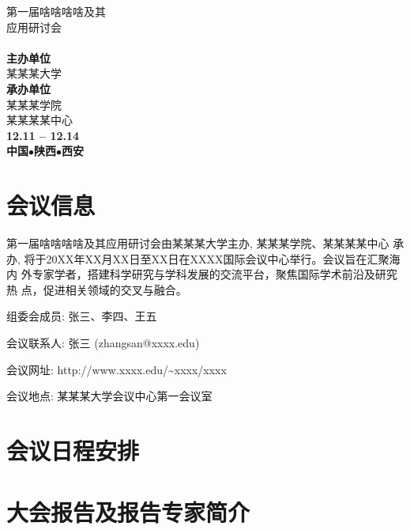 \documentclass[UTF8,openany]{book}
\makeatletter
\def\cleardoublepage{\clearpage\if@twoside \ifodd\c@page\else
  \hbox{}
  \vspace*{\fill}
  \begin{center}
    \Large\quad
  \end{center}
  \vspace{\fill}
  \thispagestyle{empty}
  \newpage
  \if@twocolumn\hbox{}\newpage\fi\fi\fi}
\newenvironment{desc}[1][]{\begin{list}{#1}{%
  \renewcommand{\makelabel}[1]{\hfil{{\bf ##1}}}}}{\end{list}}
\makeatother
\begin{document}

\begin{titlepage}
  \vspace*{5mm}
  \begin{center}
    {\lishu{} 第一届啥啥啥啥及其\\[5mm]应用研讨会}\\[15mm]
    {\bf{}}\\\vfill
    {\bf 主办单位}\\
    {某某某大学}\\[3mm]
  {\bf 承办单位}\\
{某某某学院}\\{某某某某中心}\\[8mm]
  {\bf 12.11 -- 12.14}\\
  {\bf  中国$\bullet$陕西$\bullet$西安}\\\vskip20mm
  \end{center}
\end{titlepage}

\chapter*{会议信息}
\label{cha:lun_tan_jian_jie_}
    第一届啥啥啥啥及其应用研讨会由某某某大学主办, 某某某学院、某某某某中心
    承办, 将于20XX年XX月XX日至XX日在XXXX国际会议中心举行。会议旨在汇聚海内
    外专家学者，搭建科学研究与学科发展的交流平台，聚焦国际学术前沿及研究热
    点，促进相关领域的交叉与融合。
\vskip25pt
\begin{desc}
  \item[组委会成员:]
    张三、李四、王五
  \item[会议联系人:] 张三 (zhangsan@xxxx.edu)
  \item[会议网址:] http://www.xxxx.edu/\textasciitilde xxxx/xxxx
  \item[会议地点:] 某某某大学会议中心第一会议室 
\end{desc}

\frontmatter
\mainmatter


\chapter{会议日程安排}
\label{cha:lun_tan_ri_cheng_an_pai_}


\cleardoublepage
\chapter{大会报告及报告专家简介}
\label{cha:da_hui_bao_gao_ji_bao_gao_zhuan_jia_jian_jie_}


\backmatter
\end{document}
